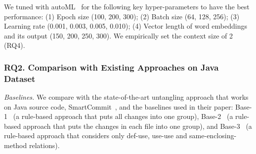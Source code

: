 We tuned {\tool} with autoML~\cite{NNI} for the following key
hyper-pa\-rameters to have the best performance: (1) Epoch size (100,
200, 300); (2) Batch size (64, 128, 256); (3) Learning rate (0.001,
0.003, 0.005, 0.010); (4) Vector length of word embeddings and its
output (150, 200, 250, 300). We empirically set the context size of 2
(RQ4).





\subsubsection{RQ2. Comparison with Existing Approaches on Java Dataset}

{\em Baselines.} We compare {\tool} with the
state-of-the-art untangling approach that works on Java source code,
SmartCommit~\cite{smartcommit-fse21}, and the baselines used in their
paper: Base-1~\cite{smartcommit-fse21} (a rule-based approach that
puts all changes into one group), Base-2~\cite{smartcommit-fse21} (a
rule-based approach that puts the changes in each file into one
group), and Base-3~\cite{smartcommit-fse21} (a rule-based approach
that considers only def-use, use-use and same-enclosing-method
relations).



